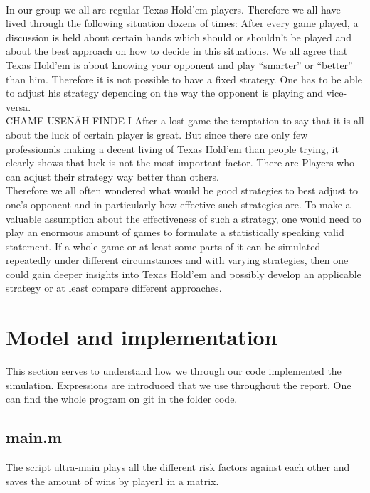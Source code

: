 \documentclass[11pt]{article}
\begin{document}
\\							
In our group we all are regular Texas Hold’em players. Therefore we all have lived through the following situation dozens of times: After every game played, a discussion is held about certain hands which should or shouldn’t be played and about the best approach on how to decide in this situations. We all agree that Texas Hold’em is about knowing your opponent and play “smarter” or “better” than him. Therefore it is not possible to have a fixed strategy. One has to be able to adjust his strategy depending on the way the opponent is playing and vice-versa.
\\
CHAME USENÄH FINDE I
After a lost game the temptation to say that it is all about the luck of certain player is great. But since there are only few professionals making a decent living of Texas Hold’em than people trying, it clearly shows that luck is not the most important factor. There are Players who can adjust their strategy way better than others.\\ 
Therefore we all often wondered what would be good strategies to best adjust to one’s opponent and in particularly how effective such strategies are. To make a valuable assumption about the effectiveness of such a strategy, one would need to play an enormous amount of games to formulate a statistically speaking valid statement. If a whole game or at least some parts of it can be simulated repeatedly under different circumstances and with varying strategies, then one could gain deeper insights into Texas Hold’em and possibly develop an applicable strategy or at least compare different approaches.


\section{Model and implementation}

 

This section serves to understand how we through our code implemented the simulation. Expressions are introduced that we use throughout the report. One can find the whole program on git in the folder code.

 

\subsection{main.m}

The script ultra-main plays all the different risk factors against each other and saves the amount of wins by player1 in a matrix.\\
\end{document}
